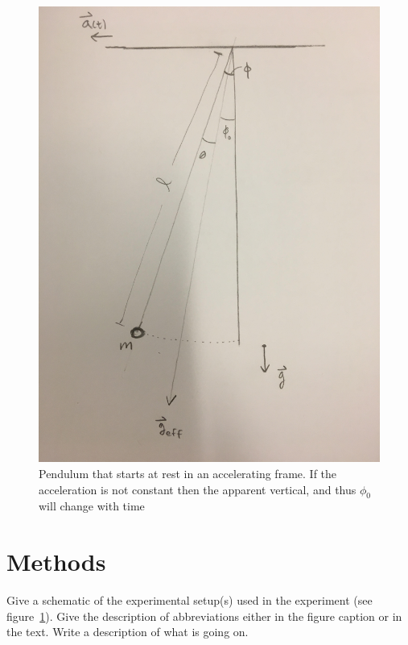 \documentclass[letterpaper,12pt]{article}
\begin{document}
\begin{figure}[!h]
    \centering
    \includegraphics[width=.8\textwidth]{pendulum.jpg}
    \caption{Pendulum that starts at rest in an accelerating frame. If the acceleration is not constant then the apparent vertical, and thus $\phi_0$ will change with time}
    \label{fig:samplesetup}
\end{figure}

\blindtext %

\section{Methods}


Give a schematic of the experimental setup(s) used in the experiment (see
figure~\ref{fig:samplesetup}). Give the description of  abbreviations
either in the figure caption or in the text. Write a description of what is
going on. 

\end{document}
